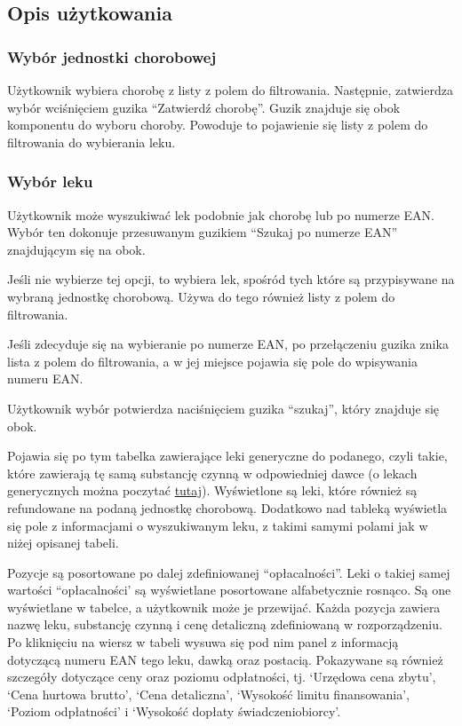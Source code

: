 \documentclass{article}
\begin{document}
    \subsection{Opis użytkowania}
      \subsubsection{Wybór jednostki chorobowej}
      Użytkownik wybiera chorobę z listy z polem do filtrowania.
      Następnie, zatwierdza wybór wciśnięciem guzika ``Zatwierdź chorobę''.
      Guzik znajduje się obok komponentu do wyboru choroby.
      Powoduje to pojawienie się listy z polem do filtrowania do wybierania leku.

      \subsubsection{Wybór leku}
      Użytkownik może wyszukiwać lek podobnie jak chorobę lub po numerze EAN.
      Wybór ten dokonuje przesuwanym guzikiem ``Szukaj po numerze EAN'' znajdującym się na obok.

      Jeśli nie wybierze tej opcji, to wybiera lek, spośród tych które są przypisywane na wybraną jednostkę chorobową.
      Używa do tego również listy z polem do filtrowania.

      Jeśli zdecyduje się na wybieranie po numerze EAN, po przełączeniu guzika znika lista z polem do filtrowania,
      a w jej miejsce pojawia się pole do wpisywania numeru EAN.

      Użytkownik wybór potwierdza naciśnięciem guzika ``szukaj'', który znajduje się obok.

      Pojawia się po tym tabelka zawierające leki generyczne do podanego, czyli takie, które zawierają tę samą substancję czynną w odpowiedniej dawce
      (o lekach generycznych można poczytać \href{https://pl.wikipedia.org/wiki/Lek_generyczny}{tutaj}).
      Wyświetlone są leki, które również są refundowane na podaną jednostkę chorobową.
      Dodatkowo nad tableką wyświetla się pole z informacjami o wyszukiwanym leku, z takimi samymi polami jak w niżej opisanej tabeli.

      Pozycje są posortowane po dalej zdefiniowanej ``opłacalności''.
      Leki o takiej samej wartości ``opłacalności' są wyświetlane posortowane alfabetycznie rosnąco.
      Są one wyświetlane w tabelce, a użytkownik może je przewijać.
      Każda pozycja zawiera nazwę leku, substancję czynną i cenę detaliczną zdefiniowaną w rozporządzeniu.
      Po kliknięciu na wiersz w tabeli wysuwa się pod nim panel z informacją dotyczącą numeru EAN tego leku, dawką oraz postacią.
      Pokazywane są również szczegóły dotyczące ceny oraz poziomu odpłatności, tj.
      `Urzędowa cena zbytu',
      `Cena hurtowa brutto',
      `Cena detaliczna',
      `Wysokość limitu finansowania',
      `Poziom odpłatności' i
      `Wysokość dopłaty świadczeniobiorcy'.
\end{document}

